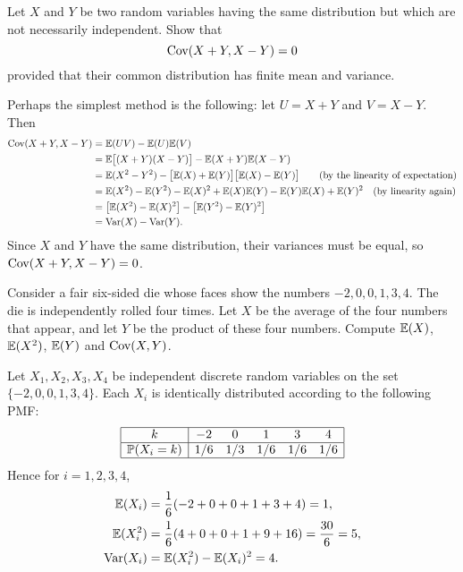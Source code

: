 \begin{exercise}
\begin{questions}
\question
Let $X$ and $Y$ be two random variables having the same distribution but which are not necessarily independent. Show that
\[
\text{Cov}(X+Y,X-Y)=0
\]
provided that their common distribution has finite mean and variance.

\begin{answer}
Perhaps the simplest method is the following: let $U=X+Y$ and $V=X-Y$. Then 
\begin{align*}
\text{Cov}(X+Y,X-Y) 
	& = \mathbb{E}(UV) - \mathbb{E}(U)\mathbb{E}(V) \\
	& = \mathbb{E}\big[(X+Y)(X-Y)\big] - \mathbb{E}(X+Y)\mathbb{E}(X-Y) \\
	& = \mathbb{E}(X^2 - Y^2) - \big[\mathbb{E}(X)+\mathbb{E}(Y)\big]\big[\mathbb{E}(X)-\mathbb{E}(Y)\big]	\qquad\text{(by the linearity of expectation)} \\
	& = \mathbb{E}(X^2) - \mathbb{E}(Y^2) - \mathbb{E}(X)^2 +\mathbb{E}(X)\mathbb{E}(Y) - \mathbb{E}(Y)\mathbb{E}(X) + \mathbb{E}(Y)^2 \quad\text{(by linearity again)} \\
	& = \big[\mathbb{E}(X^2) - \mathbb{E}(X)^2\big] - \big[\mathbb{E}(Y^2) - \mathbb{E}(Y)^2\big] \\
	& = \text{Var}(X) - \text{Var}(Y).
\end{align*}
Since $X$ and $Y$ have the same distribution, their variances must be equal, so $\text{Cov}(X+Y,X-Y)=0$.
\end{answer}



\question
Consider a fair six-sided die whose faces show the numbers $-2,0,0,1,3,4$. The die is independently rolled four times. Let $X$ be the average of the four numbers that appear, and let $Y$ be the product of these four numbers. Compute $\mathbb{E}(X)$, $\mathbb{E}(X^2)$, $\mathbb{E}(Y)$ and $\text{Cov}(X,Y)$.
\begin{answer}
Let $X_1,X_2,X_3,X_4$ be independent discrete random variables on the set $\{-2,0,0,1,3,4\}$. Each $X_i$ is identically distributed according to the following PMF:
\[\begin{array}{|c|ccccc|}\hline
k			& -2		& 0		& 1		& 3		& 4 	\\ \hline
\mathbb{P}(X_i=k)		& 1/6	& 1/3	& 1/6	& 1/6 	& 1/6	\\ \hline
\end{array}\]
Hence for $i=1,2,3,4$,
\begin{align*}
\mathbb{E}(X_i)		& = \frac{1}{6}(-2+0+0+1+3+4) = 1, \\
\mathbb{E}(X_i^2)	& = \frac{1}{6}(4+0+0+1+9+16) = \frac{30}{6} = 5, \\
\text{Var}(X_i)		& = \mathbb{E}(X_i^2)-\mathbb{E}(X_i)^2 = 4.
\end{align*}


\end{answer}
\end{questions}
\end{exercise}
